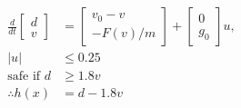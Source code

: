 \documentclass[preview]{standalone}
\begin{document}
\begin{align*}
\frac{d}{dt}\begin{bmatrix}d\\ v\end{bmatrix} &= \begin{bmatrix}v_0 - v\\ -F(v)/m\end{bmatrix} + \begin{bmatrix}0\\g_0\end{bmatrix}u, \\ |u| &\leq 0.25\\ \text{safe if } d &\geq 1.8 v\\ \therefore h(x) &= d - 1.8 v
\end{align*}
\end{document}
